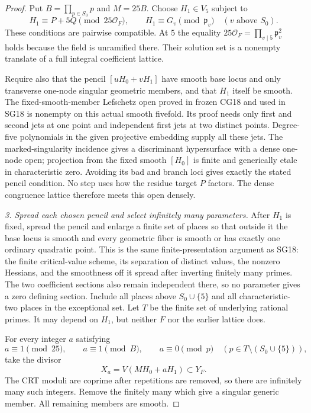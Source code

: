 \begin{proof}
Put $B=\prod_{p\in S_0}p$ and $M=25B$.  Choose $H_1\in V_5$
subject to
\[
 H_1\equiv P+5Q\pmod{25\mathcal O_F},\qquad
 H_1\equiv G_v\pmod{\mathfrak p_v}\quad(v\text{ above }S_0).
 \tag{MG21.6}\label{r21mg:H1}
\]
These conditions are pairwise compatible.  At $5$ the equality
$25\mathcal O_F=\prod_{v\mid5}\mathfrak p_v^2$ holds because
the field is unramified there.  Their solution set is a nonempty
translate of a full integral coefficient lattice.

Require also that the pencil $[uH_0+vH_1]$ have smooth base locus
and only transverse one-node singular geometric members, and that
$H_1$ itself be smooth.  The fixed-smooth-member Lefschetz open
proved in frozen CG18 and used in SG18 is nonempty on this actual
smooth fivefold.  Its proof needs only first and second jets at one
point and independent first jets at two distinct points.  Degree-five
polynomials in the given projective embedding supply all these jets.
The marked-singularity incidence gives a discriminant hypersurface
with a dense one-node open; projection from the fixed smooth
$[H_0]$ is finite and generically etale in characteristic zero.
Avoiding its bad and branch loci gives exactly the stated pencil
condition.  No step uses how the residue target $P$ factors.
The dense congruence lattice therefore meets this open densely.

\emph{3. Spread each chosen pencil and select infinitely many parameters.}
After $H_1$ is fixed, spread the pencil and enlarge a finite set of
places so that outside it the base locus is smooth and every
geometric fiber is smooth or has exactly one ordinary quadratic
point.  This is the same finite-presentation argument as SG18:
the finite critical-value scheme, its separation of distinct values,
the nonzero Hessians, and the smoothness off it spread after
inverting finitely many primes.  The two coefficient sections also
remain independent there, so no parameter gives a zero defining
section.  Include all places above $S_0\cup\{5\}$ and all
characteristic-two places in the exceptional set.
Let $T$ be the finite set of underlying rational primes.  It may
depend on $H_1$, but neither $F$ nor the earlier lattice does.

For every integer $a$ satisfying
\[
 a\equiv1\pmod{25},\qquad a\equiv1\pmod B,\qquad
 a\equiv0\pmod p\quad(p\in T\setminus(S_0\cup\{5\})),
 \tag{MG21.7}\label{r21mg:a}
\]
take the divisor
\[
                              X_a=V(MH_0+aH_1)\subset Y_F.
 \tag{MG21.8}\label{r21mg:Xa}
\]
The CRT moduli are coprime after repetitions are removed, so there
are infinitely many such integers.  Remove the finitely many which
give a singular generic member.  All remaining members are smooth.


\end{proof}
